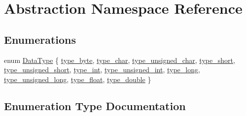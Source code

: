 \hypertarget{namespaceAbstraction}{}\section{Abstraction Namespace Reference}
\label{namespaceAbstraction}
\subsection*{Enumerations}
\begin{DoxyCompactItemize}
\item 
enum \mbox{\hyperlink{namespaceAbstraction_a4cb76335aa0f291a9c5e3243653142b6}{Data\+Type}} \{ \newline
\mbox{\hyperlink{namespaceAbstraction_a4cb76335aa0f291a9c5e3243653142b6a09efe0f05f3381a36a5204482ab9e14d}{type\+\_\+byte}}, 
\mbox{\hyperlink{namespaceAbstraction_a4cb76335aa0f291a9c5e3243653142b6ab790319c3c66bacaf9ea9dd0bc77dc4f}{type\+\_\+char}}, 
\mbox{\hyperlink{namespaceAbstraction_a4cb76335aa0f291a9c5e3243653142b6a2334bbb84bd996684a1e1710ad013478}{type\+\_\+unsigned\+\_\+char}}, 
\mbox{\hyperlink{namespaceAbstraction_a4cb76335aa0f291a9c5e3243653142b6aba60a14f1cac8708679c486b26ab6bcf}{type\+\_\+short}}, 
\newline
\mbox{\hyperlink{namespaceAbstraction_a4cb76335aa0f291a9c5e3243653142b6ad5b1d351112e27b39743ee07854c953c}{type\+\_\+unsigned\+\_\+short}}, 
\mbox{\hyperlink{namespaceAbstraction_a4cb76335aa0f291a9c5e3243653142b6a97254d30a88cb3658b14971d4f5c0f23}{type\+\_\+int}}, 
\mbox{\hyperlink{namespaceAbstraction_a4cb76335aa0f291a9c5e3243653142b6ac2076dbae89a400c740481fe899261e4}{type\+\_\+unsigned\+\_\+int}}, 
\mbox{\hyperlink{namespaceAbstraction_a4cb76335aa0f291a9c5e3243653142b6a4e972ab29af5757cac3549d05370a3bd}{type\+\_\+long}}, 
\newline
\mbox{\hyperlink{namespaceAbstraction_a4cb76335aa0f291a9c5e3243653142b6ac973c7f28ea1ae1b9c90abfb83937b2d}{type\+\_\+unsigned\+\_\+long}}, 
\mbox{\hyperlink{namespaceAbstraction_a4cb76335aa0f291a9c5e3243653142b6a518548d6e03d9b2bb74843da7c9785c7}{type\+\_\+float}}, 
\mbox{\hyperlink{namespaceAbstraction_a4cb76335aa0f291a9c5e3243653142b6a993738fea65f10b646638955cae91820}{type\+\_\+double}}
 \}
\end{DoxyCompactItemize}


\subsection{Enumeration Type Documentation}
\mbox{\label{namespaceAbstraction_a4cb76335aa0f291a9c5e3243653142b6}} 
